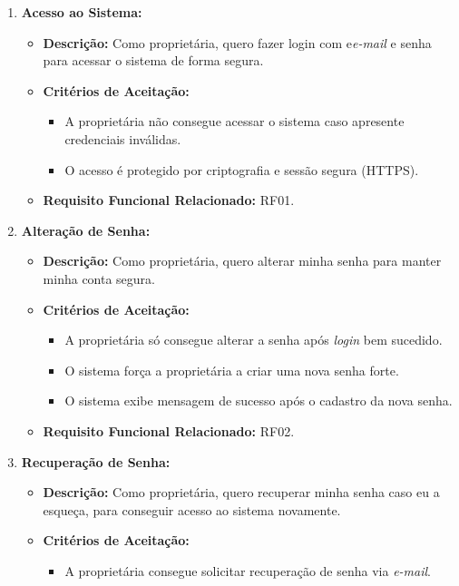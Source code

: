 \documentclass[
	12pt,				%
	openany,			%
	twoside,			%
	a4paper,			%
	english,			%
	french,				%
	spanish,			%
	brazil				%
	]{abntex2}
\begin{document}
\begin{enumerate}[label=\textbf{\arabic*.}]
	\item \textbf{Acesso ao Sistema:}
	\begin{itemize}
	 \item \textbf{Descrição:} Como proprietária, quero fazer login com e\textit{e-mail} e senha para acessar o sistema de forma segura. 
	  \item	\textbf{Critérios de Aceitação:}	
	\begin{itemize} 
		\item A proprietária não consegue acessar o sistema caso apresente credenciais inválidas.
		\item O acesso é protegido por criptografia e sessão segura (HTTPS).
	\end{itemize}
	 \item \textbf{Requisito Funcional Relacionado:} RF01.
	 	\end{itemize} 
	 	\item \textbf{Alteração de Senha:}
	 	\begin{itemize}
	 		\item \textbf{Descrição:} Como proprietária, quero alterar minha senha para manter minha conta segura.
	 		\item \textbf{Critérios de Aceitação:}
	 		\begin{itemize} 
	 			\item A proprietária só consegue alterar a senha após \textit{login} bem sucedido.
	 			\item O sistema força a proprietária a criar uma nova senha forte.
	 			\item O sistema exibe mensagem de sucesso após o cadastro da nova senha.
	 		\end{itemize}
	 		\item \textbf{Requisito Funcional Relacionado:} RF02.
	 	\end{itemize} 
	 	\item \textbf{Recuperação de Senha:}
	 	\begin{itemize}
	 		\item \textbf{Descrição:} Como proprietária, quero recuperar minha senha caso eu a esqueça, para conseguir acesso ao sistema novamente.
	 		\item \textbf{Critérios de Aceitação:}
	 		\begin{itemize} 
	 			\item A proprietária consegue solicitar recuperação de senha via \textit{e-mail}.

\end{itemize}
\end{itemize}
\end{enumerate}
\end{document}
